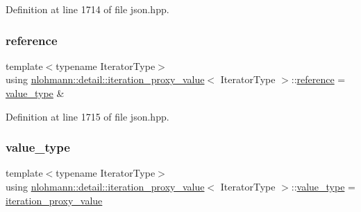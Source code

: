 Definition at line 1714 of file json.\+hpp.

\mbox{\label{classnlohmann_1_1detail_1_1iteration__proxy__value_a5bc7d3133daab5ec4797f3132e093af8}} 
\subsubsection{\texorpdfstring{reference}{reference}}
{\footnotesize\ttfamily template$<$typename Iterator\+Type$>$ \\
using \mbox{\hyperlink{classnlohmann_1_1detail_1_1iteration__proxy__value}{nlohmann\+::detail\+::iteration\+\_\+proxy\+\_\+value}}$<$ Iterator\+Type $>$\+::\mbox{\hyperlink{classnlohmann_1_1detail_1_1iteration__proxy__value_a5bc7d3133daab5ec4797f3132e093af8}{reference}} =  \mbox{\hyperlink{classnlohmann_1_1detail_1_1iteration__proxy__value_a5e90a5810cc1bb6c1000eabbfdfe7b9e}{value\+\_\+type}} \&}



Definition at line 1715 of file json.\+hpp.

\mbox{\label{classnlohmann_1_1detail_1_1iteration__proxy__value_a5e90a5810cc1bb6c1000eabbfdfe7b9e}} 
\subsubsection{\texorpdfstring{value\_type}{value\_type}}
{\footnotesize\ttfamily template$<$typename Iterator\+Type$>$ \\
using \mbox{\hyperlink{classnlohmann_1_1detail_1_1iteration__proxy__value}{nlohmann\+::detail\+::iteration\+\_\+proxy\+\_\+value}}$<$ Iterator\+Type $>$\+::\mbox{\hyperlink{classnlohmann_1_1detail_1_1iteration__proxy__value_a5e90a5810cc1bb6c1000eabbfdfe7b9e}{value\+\_\+type}} =  \mbox{\hyperlink{classnlohmann_1_1detail_1_1iteration__proxy__value}{iteration\+\_\+proxy\+\_\+value}}}



